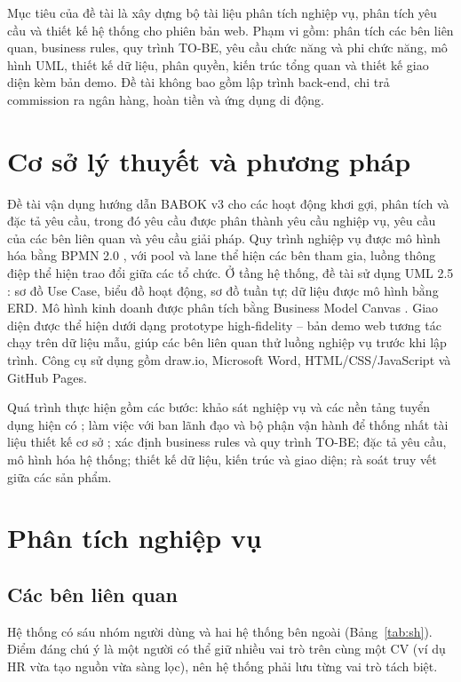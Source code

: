 \documentclass[11pt,a4paper]{article}
\begin{document}
Mục tiêu của đề tài là xây dựng bộ tài liệu phân tích nghiệp vụ, phân tích yêu cầu và thiết kế hệ thống cho phiên bản web. Phạm vi gồm: phân tích các bên liên quan, business rules, quy trình TO-BE, yêu cầu chức năng và phi chức năng, mô hình UML, thiết kế dữ liệu, phân quyền, kiến trúc tổng quan và thiết kế giao diện kèm bản demo. Đề tài không bao gồm lập trình back-end, chi trả commission ra ngân hàng, hoàn tiền và ứng dụng di động.

\section{Cơ sở lý thuyết và phương pháp}
Đề tài vận dụng hướng dẫn BABOK v3 \cite{babok} cho các hoạt động khơi gợi, phân tích và đặc tả yêu cầu, trong đó yêu cầu được phân thành yêu cầu nghiệp vụ, yêu cầu của các bên liên quan và yêu cầu giải pháp. Quy trình nghiệp vụ được mô hình hóa bằng BPMN 2.0 \cite{bpmn}, với pool và lane thể hiện các bên tham gia, luồng thông điệp thể hiện trao đổi giữa các tổ chức. Ở tầng hệ thống, đề tài sử dụng UML 2.5 \cite{uml}: sơ đồ Use Case, biểu đồ hoạt động, sơ đồ tuần tự; dữ liệu được mô hình bằng ERD. Mô hình kinh doanh được phân tích bằng Business Model Canvas \cite{bmc}. Giao diện được thể hiện dưới dạng prototype high-fidelity – bản demo web tương tác chạy trên dữ liệu mẫu, giúp các bên liên quan thử luồng nghiệp vụ trước khi lập trình. Công cụ sử dụng gồm draw.io, Microsoft Word, HTML/CSS/JavaScript và GitHub Pages.

Quá trình thực hiện gồm các bước: khảo sát nghiệp vụ và các nền tảng tuyển dụng hiện có \cite{topcv,vnw}; làm việc với ban lãnh đạo và bộ phận vận hành để thống nhất tài liệu thiết kế cơ sở \cite{lh_tkcs}; xác định business rules và quy trình TO-BE; đặc tả yêu cầu, mô hình hóa hệ thống; thiết kế dữ liệu, kiến trúc và giao diện; rà soát truy vết giữa các sản phẩm.

\section{Phân tích nghiệp vụ}
\subsection{Các bên liên quan}
Hệ thống có sáu nhóm người dùng và hai hệ thống bên ngoài (Bảng~\ref{tab:sh}). Điểm đáng chú ý là một người có thể giữ nhiều vai trò trên cùng một CV (ví dụ HR vừa tạo nguồn vừa sàng lọc), nên hệ thống phải lưu từng vai trò tách biệt.
\end{document}
